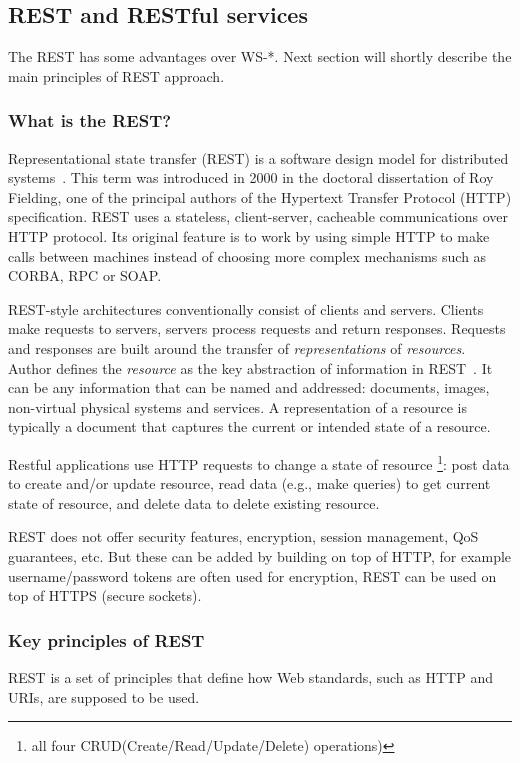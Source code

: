 \subsection{REST and RESTful services}
The REST has some advantages over WS-*. Next section will shortly
describe the main principles of REST approach. 

\subsubsection{What is the REST?}
Representational state transfer (REST) is a software design model for
distributed systems~\cite{Fielding2000}. This term was introduced in 2000 in the doctoral dissertation of
Roy Fielding, one of the principal authors of the Hypertext Transfer Protocol
(HTTP) specification.
REST uses a stateless, client-server, cacheable communications over HTTP protocol. Its original
feature is to work by using simple HTTP to make calls between machines instead
of choosing more complex mechanisms such as CORBA, RPC or SOAP.

REST-style architectures conventionally consist of clients and servers.
Clients make requests to servers, servers process requests and return responses.
Requests and responses are built around the transfer of \textit{representations}
of \textit{resources}.
Author defines the \textit{resource} as the key abstraction of information in
REST~\cite{Fielding2000}. It can be any information that can be named and
addressed: documents, images, non-virtual physical systems and services.
A representation of a resource is typically a document that captures the current or intended state of a resource.

Restful applications use HTTP requests to change a state of resource  \footnote{
all four CRUD(Create/Read/Update/Delete) operations)}: post data to create and/or update
resource, read data (e.g., make queries) to get current state of resource, and
delete data to delete existing resource.

REST does not offer security features, encryption, session management, QoS
guarantees, etc. But these can be added by building on top of HTTP, for example
username/password tokens are often used for encryption, REST can be used on
top of HTTPS (secure sockets)\cite{ws_technologies_state_of_the_art}.

\subsubsection{Key principles of REST}
REST is a set of principles that define how Web standards, such as HTTP and
\gls{URI}s, are supposed to be used.

